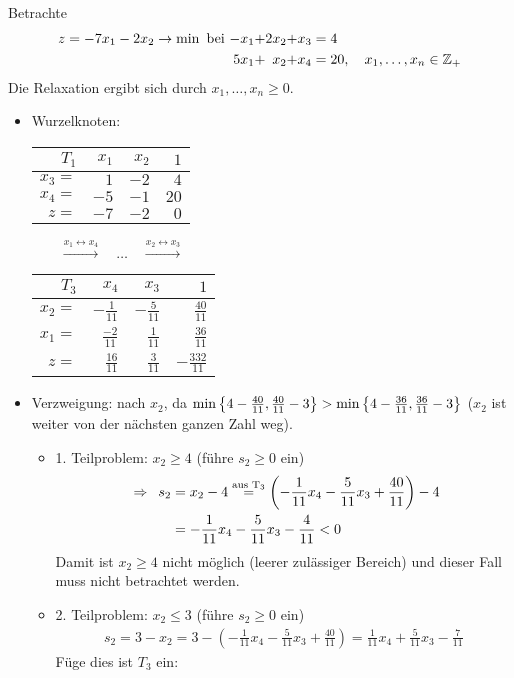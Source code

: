 \begin{beispiel}
	Betrachte 
	\begin{equation*}
	\begin{alignedat}{4}
		z = -7x_1 - 2x_2 \to \min \text{ bei } &&-x_1 &+ &2x_2 &+ &x_3 &= 4 \\
		&&5x_1 &+ &x_2 &+ &x_4 &= 20, \quad x_1, \dots, x_n \in \mathbb{Z}_+
	\end{alignedat}
	\end{equation*}
	Die Relaxation ergibt sich durch $x_1, \dots, x_n \ge 0$.
	\begin{itemize}[leftmargin=*]
		\item Wurzelknoten:
		\begin{center}
			\begin{tabular}{r|rr|r}
				$T_1$ & $x_1$ & $x_2$ & $1$ \\ \hline
				$x_3 = $ & $1$ & $-2$ & $4$ \\
				$x_4 = $ & $-5$ & $-1$ & $20$ \\ \hline
				$z = $   & $-7$ & $-2$ & $0$
			\end{tabular}
			$\qquad \overset{x_1 \leftrightarrow x_4}{\longrightarrow} \quad \dots \quad \overset{x_2 \leftrightarrow x_3}{\longrightarrow} \qquad$
			\begin{tabular}{r|rr|r}
				$T_3$ & $x_4$ & $x_3$ & $1$ \\ \hline
				$x_2 = $ & $-\frac{1}{11}$ & $-\frac{5}{11}$ & $\frac{40}{11}$ \\
				$x_1 = $ & $\frac{-2}{11}$ & $\frac{1}{11}$ & $\frac{36}{11}$ \\ \hline
				$z = $   & $\frac{16}{11}$ & $\frac{3}{11}$ & $-\frac{332}{11}$
			\end{tabular}
		\end{center}	
		\item Verzweigung: nach $x_2$, da $\min \left\{ 4-\frac{40}{11}, \frac{40}{11} - 3 \right\} > \min \left\{ 4 - \frac{36}{11}, \frac{36}{11} - 3 \right\}$ ($x_2$ ist weiter von der nächsten ganzen Zahl weg). 
		\begin{itemize}
			\item 1. Teilproblem: $x_2 \ge 4$ (führe $s_2 \ge 0$ ein)
			\begin{equation*}
				\begin{aligned}
					\enskip \Rightarrow \enskip s_2 &= x_2 - 4 
					\overset{\text{aus T}_3}{=} \left( -\frac{1}{11}x_4 - \frac{5}{11} x_3 + \frac{40}{11} \right) - 4 \\
					&= -\frac{1}{11} x_4 - \frac{5}{11} x_3 - \frac{4}{11} < 0
				\end{aligned}
			\end{equation*}
			Damit ist $x_2 \ge 4$ nicht möglich (leerer zulässiger Bereich) und dieser Fall muss nicht betrachtet werden.
			\item 2. Teilproblem: $x_2 \le 3$ (führe $s_2 \ge 0$ ein)
			\begin{equation*}
				\begin{aligned}
					s_2 = 3 - x_2 = 3 - (-\frac{1}{11} x_4 - \frac{5}{11} x_3 + \frac{40}{11}) 
					= \frac{1}{11} x_4 + \frac{5}{11} x_3 - \frac{7}{11}
				\end{aligned}
			\end{equation*}
			Füge dies ist $T_3$ ein:
			

\end{itemize}
\end{itemize}
\end{beispiel}
